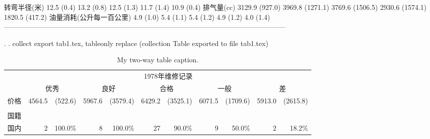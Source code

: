 \documentclass{ctexart}
\begin{document}
转弯半径(米)                12.5     (0.4)     13.2      (0.8)     12.5      (1.3)     11.7      (1.4)     10.9      (0.4)
排气量(cc)                3129.9   (927.0)   3969.8   (1271.1)   3769.6   (1506.5)   2930.6   (1574.1)   1820.5    (417.2)
油量消耗(公升每一百公里)     4.9     (1.0)      5.4      (1.1)      5.4      (1.2)      4.9      (1.2)      4.0      (1.4)
--------------------------------------------------------------------------------------------------------------------------

. 
. collect export tab1.tex, tableonly replace
(collection Table exported to file tab1.tex)

\fi


\begin{table}[H]
\centering
\caption{My two-way table caption.}
\begin{tabular}{lllllllllll}
\cline{1-11}
\multicolumn{1}{c}{} &
  \multicolumn{10}{c}{1978年维修记录} \\
\multicolumn{1}{c}{} &
  \multicolumn{2}{c}{优秀} &
  \multicolumn{2}{c}{良好} &
  \multicolumn{2}{c}{合格} &
  \multicolumn{2}{c}{一般} &
  \multicolumn{2}{c}{差} \\
\cline{1-11}
\multicolumn{1}{l}{价格} &
  \multicolumn{1}{r}{4564.5} &
  \multicolumn{1}{r}{(522.6)} &
  \multicolumn{1}{r}{5967.6} &
  \multicolumn{1}{r}{(3579.4)} &
  \multicolumn{1}{r}{6429.2} &
  \multicolumn{1}{r}{(3525.1)} &
  \multicolumn{1}{r}{6071.5} &
  \multicolumn{1}{r}{(1709.6)} &
  \multicolumn{1}{r}{5913.0} &
  \multicolumn{1}{r}{(2615.8)} \\
\multicolumn{1}{l}{} &
  \multicolumn{1}{r}{} &
  \multicolumn{1}{r}{} &
  \multicolumn{1}{r}{} &
  \multicolumn{1}{r}{} &
  \multicolumn{1}{r}{} &
  \multicolumn{1}{r}{} &
  \multicolumn{1}{r}{} &
  \multicolumn{1}{r}{} &
  \multicolumn{1}{r}{} &
  \multicolumn{1}{r}{} \\
\multicolumn{1}{l}{国籍} &
  \multicolumn{1}{r}{} &
  \multicolumn{1}{r}{} &
  \multicolumn{1}{r}{} &
  \multicolumn{1}{r}{} &
  \multicolumn{1}{r}{} &
  \multicolumn{1}{r}{} &
  \multicolumn{1}{r}{} &
  \multicolumn{1}{r}{} &
  \multicolumn{1}{r}{} &
  \multicolumn{1}{r}{} \\
\multicolumn{1}{l}{\hspace{1em}国内} &
  \multicolumn{1}{r}{2} &
  \multicolumn{1}{r}{100.0\%} &
  \multicolumn{1}{r}{8} &
  \multicolumn{1}{r}{100.0\%} &
  \multicolumn{1}{r}{27} &
  \multicolumn{1}{r}{90.0\%} &
  \multicolumn{1}{r}{9} &
  \multicolumn{1}{r}{50.0\%} &
  \multicolumn{1}{r}{2} &
  \multicolumn{1}{r}{18.2\%} \\

\end{tabular}
\end{table}
\end{document}
